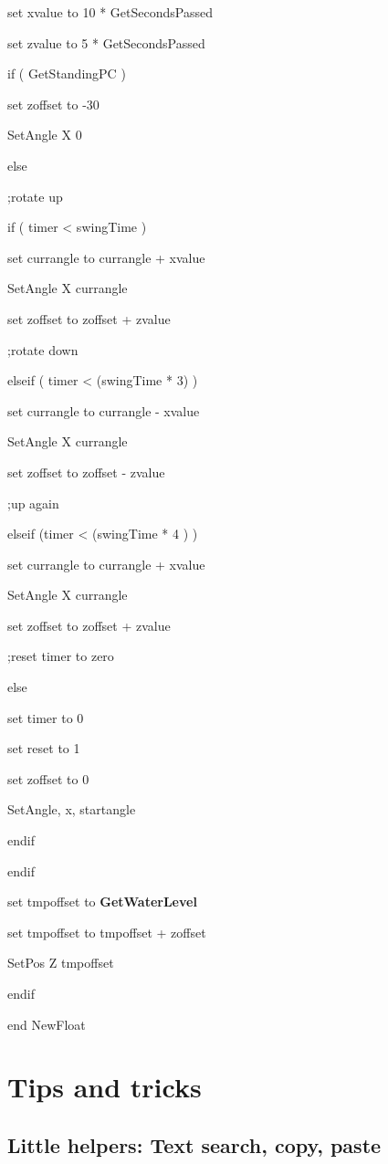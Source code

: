 \documentclass[
]{article}
\begin{document}
set xvalue to 10 * GetSecondsPassed

set zvalue to 5 * GetSecondsPassed

if ( GetStandingPC )

set zoffset to -30

SetAngle X 0

else

;rotate up

if ( timer \textless{} swingTime )

set currangle to currangle + xvalue

SetAngle X currangle

set zoffset to zoffset + zvalue

;rotate down

elseif ( timer \textless{} (swingTime * 3) )

set currangle to currangle - xvalue

SetAngle X currangle

set zoffset to zoffset - zvalue

;up again

elseif (timer \textless{} (swingTime * 4 ) )

set currangle to currangle + xvalue

SetAngle X currangle

set zoffset to zoffset + zvalue

;reset timer to zero

else

set timer to 0

set reset to 1

set zoffset to 0

SetAngle, x, startangle

endif

endif

set tmpoffset to \textbf{GetWaterLevel}

set tmpoffset to tmpoffset + zoffset

SetPos Z tmpoffset

endif

end NewFloat

\hypertarget{tips-and-tricks}{%
\section{\texorpdfstring{\hfill\break
Tips and tricks}{ Tips and tricks}}\label{tips-and-tricks}}

\hypertarget{little-helpers-text-search-copy-paste}{%
\subsection{Little helpers: Text search, copy,
paste}\label{little-helpers-text-search-copy-paste}}
\end{document}

